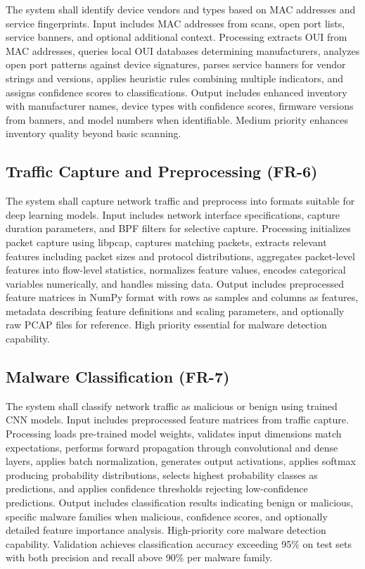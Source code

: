 The system shall identify device vendors and types based on MAC addresses and service fingerprints. Input includes MAC addresses from scans, open port lists, service banners, and optional additional context. Processing extracts OUI from MAC addresses, queries local OUI databases determining manufacturers, analyzes open port patterns against device signatures, parses service banners for vendor strings and versions, applies heuristic rules combining multiple indicators, and assigns confidence scores to classifications. Output includes enhanced inventory with manufacturer names, device types with confidence scores, firmware versions from banners, and model numbers when identifiable. Medium priority enhances inventory quality beyond basic scanning.

\subsection{Traffic Capture and Preprocessing (FR-6)}

The system shall capture network traffic and preprocess into formats suitable for deep learning models. Input includes network interface specifications, capture duration parameters, and BPF filters for selective capture. Processing initializes packet capture using libpcap, captures matching packets, extracts relevant features including packet sizes and protocol distributions, aggregates packet-level features into flow-level statistics, normalizes feature values, encodes categorical variables numerically, and handles missing data. Output includes preprocessed feature matrices in NumPy format with rows as samples and columns as features, metadata describing feature definitions and scaling parameters, and optionally raw PCAP files for reference. High priority essential for malware detection capability.

\subsection{Malware Classification (FR-7)}

The system shall classify network traffic as malicious or benign using trained CNN models. Input includes preprocessed feature matrices from traffic capture. Processing loads pre-trained model weights, validates input dimensions match expectations, performs forward propagation through convolutional and dense layers, applies batch normalization, generates output activations, applies softmax producing probability distributions, selects highest probability classes as predictions, and applies confidence thresholds rejecting low-confidence predictions. Output includes classification results indicating benign or malicious, specific malware families when malicious, confidence scores, and optionally detailed feature importance analysis. High-priority core malware detection capability. Validation achieves classification accuracy exceeding 95\% on test sets with both precision and recall above 90\% per malware family.

